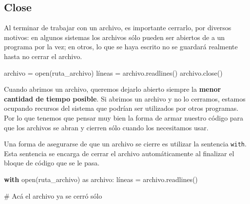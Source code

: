 \documentclass[
  letterpaper,
  DIV=11,
  numbers=noendperiod]{scrreprt}
\newenvironment{Shaded}{\begin{snugshade}}{\end{snugshade}}
\newcommand{\BuiltInTok}[1]{\textcolor[rgb]{0.00,0.23,0.31}{#1}}
\newcommand{\CommentTok}[1]{\textcolor[rgb]{0.37,0.37,0.37}{#1}}
\newcommand{\ControlFlowTok}[1]{\textcolor[rgb]{0.00,0.23,0.31}{\textbf{#1}}}
\newcommand{\ImportTok}[1]{\textcolor[rgb]{0.00,0.46,0.62}{#1}}
\newcommand{\NormalTok}[1]{\textcolor[rgb]{0.00,0.23,0.31}{#1}}
\newcommand{\OperatorTok}[1]{\textcolor[rgb]{0.37,0.37,0.37}{#1}}
\begin{document}
\subsection{Close}\label{close}

Al terminar de trabajar con un archivo, es importante cerrarlo, por
diversos motivos: en algunos sistemas los archivos sólo pueden ser
abiertos de a un programa por la vez; en otros, lo que se haya escrito
no se guardará realmente hasta no cerrar el archivo.

\begin{Shaded}
\begin{Highlighting}[]
\NormalTok{archivo }\OperatorTok{=} \BuiltInTok{open}\NormalTok{(ruta\_archivo)}
\NormalTok{líneas }\OperatorTok{=}\NormalTok{ archivo.readlines()}
\NormalTok{archivo.close()}
\end{Highlighting}
\end{Shaded}

\begin{tcolorbox}[enhanced jigsaw, arc=.35mm, toptitle=1mm, colframe=quarto-callout-warning-color-frame, bottomtitle=1mm, opacitybacktitle=0.6, colbacktitle=quarto-callout-warning-color!10!white, leftrule=.75mm, coltitle=black, toprule=.15mm, titlerule=0mm, title=\textcolor{quarto-callout-warning-color}{\faExclamationTriangle}\hspace{0.5em}{Warning}, bottomrule=.15mm, rightrule=.15mm, colback=white, breakable, opacityback=0, left=2mm]

Cuando abrimos un archivo, queremos dejarlo abierto siempre la
\textbf{menor cantidad de tiempo posible}. Si abrimos un archivo y no lo
cerramos, estamos ocupando recursos del sistema que podrían ser
utilizados por otros programas. Por lo que tenemos que pensar muy bien
la forma de armar nuestro código para que los archivos se abran y
cierren sólo cuando los necesitamos usar.

\end{tcolorbox}

Una forma de asegurarse de que un archivo se cierre es utilizar la
sentencia \texttt{with}. Esta sentencia se encarga de cerrar el archivo
automáticamente al finalizar el bloque de código que se le pasa.

\begin{Shaded}
\begin{Highlighting}[]
\ControlFlowTok{with} \BuiltInTok{open}\NormalTok{(ruta\_archivo) }\ImportTok{as}\NormalTok{ archivo:}
\NormalTok{  líneas }\OperatorTok{=}\NormalTok{ archivo.readlines()}

\CommentTok{\# Acá el archivo ya se cerró sólo}
\end{Highlighting}
\end{Shaded}
\end{document}
